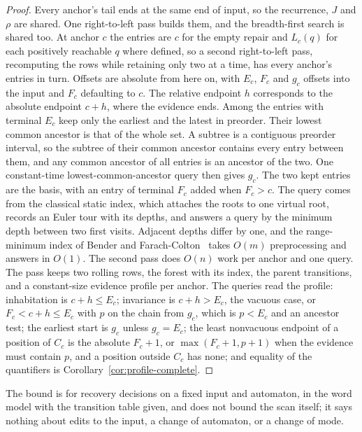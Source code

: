 \documentclass[11pt,a4paper]{article}
\theoremstyle{definition}
\theoremstyle{plain}
\theoremstyle{remark}
\begin{document}
\begin{proof}
Every anchor's tail ends at the same end of input, so the recurrence, $J$ and $\rho$ are shared. One right-to-left pass
builds them, and the breadth-first search is shared too. At anchor $c$ the entries are $c$ for the empty repair and
$L_c(q)$ for each positively reachable $q$ where defined, so a second right-to-left pass, recomputing the rows while
retaining only two at a time, has every anchor's entries in turn. Offsets are absolute from here on, with $E_c$, $F_c$
and $g_c$ offsets into the input and $F_c$ defaulting to $c$. The relative endpoint $h$ corresponds to the absolute
endpoint $c + h$, where the evidence ends. Among the entries with terminal $E_c$ keep only the earliest and the latest
in preorder. Their lowest common ancestor is that of the whole set. A subtree is a contiguous preorder interval, so the
subtree of their common ancestor contains every entry between them, and any common ancestor of all entries is an
ancestor of the two. One constant-time lowest-common-ancestor query then gives $g_c$. The two kept entries are the
basis, with an entry of terminal $F_c$ added when $F_c > c$. The query comes from the classical static index, which
attaches the roots to one virtual root, records an Euler tour with its depths, and answers a query by the minimum depth
between two first visits. Adjacent depths differ by one, and the range-minimum index of Bender and
Farach-Colton~\citep{bender2000lca} takes $O(m)$ preprocessing and answers in $O(1)$. The second pass does $O(n)$ work
per anchor and one query. The pass keeps two rolling rows, the forest with its index, the parent transitions, and a
constant-size evidence profile per anchor. The queries read the profile: inhabitation is $c + h \le E_c$; invariance is
$c + h > E_c$, the vacuous case, or $F_c < c + h \le E_c$ with $p$ on the chain from $g_c$, which is $p < E_c$ and an
ancestor test; the earliest start is $g_c$ unless $g_c = E_c$; the least nonvacuous endpoint of a position of $C_c$ is
the absolute $F_c + 1$, or $\max(F_c + 1, p + 1)$ when the evidence must contain $p$, and a position outside $C_c$ has
none; and equality of the quantifiers is Corollary~\ref{cor:profile-complete}.
\end{proof}

The bound is for recovery decisions on a fixed input and automaton, in the word model with the transition table given,
and does not bound the scan itself; it says nothing about edits to the input, a change of automaton, or a change of
mode.
\end{document}
